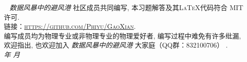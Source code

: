 \documentclass[11pt,a4paper]{ctexbook}
\title{\huge \heiti{高显经典力学习题解答}}
\author{ \ttfamily \texttt \Large 数据风暴中的避风港\\}
\date{\large \today}
\begin{document}
\maketitle

\pagestyle{fancy}
\fancyhf{}
\fancyhead{}
~\vfill
\noindent \textit{数据风暴中的避风港 }\textsc{ 社区成员共同编写, 本习题解答及其\LaTeX 代码符合 MIT 许可.}\\

\noindent \textsc{链接：\url{https://github.com/Phiyu/GaoXian}}.\\

\noindent \textsc{编写成员均为物理专业或非物理专业的物理爱好者, 编写过程中难免有许多纰漏, 欢迎指出, 也欢迎加入}
\textit{ 数据风暴中的避风港 } 
\textsc{大家庭（QQ群：832100706） .}\\

\noindent \textit{\number\year 年 \number\month 月} %

\tableofcontents

\newpage
\pagestyle{fancy}
\fancyhf{} 
\fancyhead[LE]{\kaishu \leftmark}
\fancyhead[RO]{\kaishu \leftmark}
\cfoot{\thepage}

\setcounter{page}{1}

\setcounter{problem}{0}
\newpage


\setcounter{problem}{0}
\newpage 


\newpage


\newpage 


\newpage


\newpage 


\newpage


\newpage 


\newpage


\newpage 


\newpage


\newpage 


\newpage


\newpage 


\newpage


\newpage 


\newpage

\end{document}
